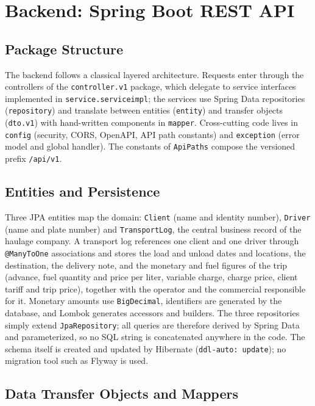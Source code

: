 \section{Backend: Spring Boot REST API}
\label{sec:impl-back}

\subsection{Package Structure}

The backend follows a classical layered architecture. Requests enter through the controllers of the \texttt{controller.v1} package, which delegate to service interfaces implemented in \texttt{service.serviceimpl}; the services use Spring Data repositories (\texttt{repository}) and translate between entities (\texttt{entity}) and transfer objects (\texttt{dto.v1}) with hand-written components in \texttt{mapper}. Cross-cutting code lives in \texttt{config} (security, CORS, OpenAPI, API path constants) and \texttt{exception} (error model and global handler). The constants of \texttt{ApiPaths} compose the versioned prefix \texttt{/api/v1}.

\subsection{Entities and Persistence}

Three JPA entities map the domain: \texttt{Client} (name and identity number), \texttt{Driver} (name and plate number) and \texttt{TransportLog}, the central business record of the haulage company. A transport log references one client and one driver through \texttt{@ManyToOne} associations and stores the load and unload dates and locations, the destination, the delivery note, and the monetary and fuel figures of the trip (advance, fuel quantity and price per liter, variable charge, charge price, client tariff and trip price), together with the operator and the commercial responsible for it. Monetary amounts use \texttt{BigDecimal}, identifiers are generated by the database, and Lombok generates accessors and builders. The three repositories simply extend \texttt{JpaRepository}; all queries are therefore derived by Spring Data and parameterized, so no SQL string is concatenated anywhere in the code. The schema itself is created and updated by Hibernate (\texttt{ddl-auto: update}); no migration tool such as Flyway is used.


\subsection{Data Transfer Objects and Mappers}

